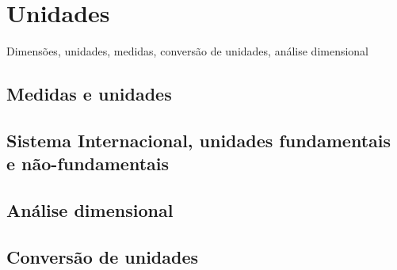 \chapter{Unidades}
\label{Chap:Unidades}

\begin{fullwidth}
    Dimensões, unidades, medidas, conversão de unidades, análise dimensional
\end{fullwidth}

\section{Medidas e unidades}

\section{Sistema Internacional, unidades fundamentais e não-fundamentais}

\section{Análise dimensional}

\section{Conversão de unidades}


